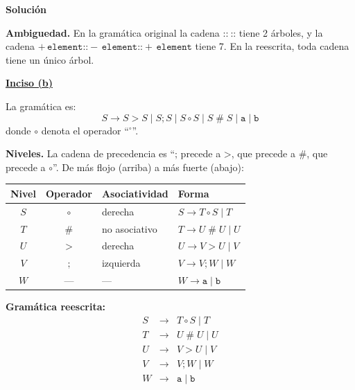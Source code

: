 \documentclass[12pt, letterpaper]{article}
\newcommand{\tk}[1]{\mathtt{#1}}
\newcommand{\occ}{\mathbin{\texttt{::}}}
\newcommand{\osc}{\mathbin{;}}
\newcommand{\ogt}{\mathbin{>}}
\newcommand{\ohs}{\mathbin{\#}}
\newcommand{\odg}{\mathbin{\circ}}
\newenvironment{solucion}{\par\medskip\noindent\textbf{\large Solución}\par\smallskip}{\par\bigskip}
\begin{document}
\begin{enumerate}
\begin{solucion}
\begin{itemize}[leftmargin=*]
    \end{itemize}

    \textbf{Ambiguedad.} En la gramática original la cadena
    $\occ\ \occ$ tiene 2 árboles, y la cadena
    $+\,\tk{element} \occ -\,\tk{element} \occ +\,\tk{element}$ tiene 7. En la
    reescrita, toda cadena tiene un único árbol.



    \medskip\noindent\textbf{\underline{Inciso (b)}}

    La gramática es:
    \[
    S \to S \ogt S \mid S \osc S \mid S \odg S \mid S \ohs S \mid \tk{a} \mid \tk{b}
    \]
    donde $\odg$ denota el operador ``$^\circ$''.

    \textbf{Niveles.} La cadena de precedencia es
    ``$\osc$ precede a $\ogt$, que precede a $\ohs$, que precede a $\odg$''. De
    más flojo (arriba) a más fuerte (abajo):

    \begin{center}
      \begin{tabular}{c c l l}
        \toprule
        Nivel & Operador & Asociatividad & Forma \\
        \midrule
        $S$ & $\odg$ & derecha       & $S \to T \odg S \mid T$ \\
        $T$ & $\ohs$ & no asociativo & $T \to U \ohs U \mid U$ \\
        $U$ & $\ogt$ & derecha       & $U \to V \ogt U \mid V$ \\
        $V$ & $\osc$ & izquierda     & $V \to V \osc W \mid W$ \\
        $W$ & ---    & ---           & $W \to \tk{a} \mid \tk{b}$ \\
        \bottomrule
      \end{tabular}
    \end{center}

    \textbf{Gramática reescrita:}
    \[
    \begin{array}{rcl}
      S &\to& T \odg S \mid T \\
      T &\to& U \ohs U \mid U \\
      U &\to& V \ogt U \mid V \\
      V &\to& V \osc W \mid W \\
      W &\to& \tk{a} \mid \tk{b}
    \end{array}
    \]


\end{solucion}
\end{enumerate}
\end{document}
